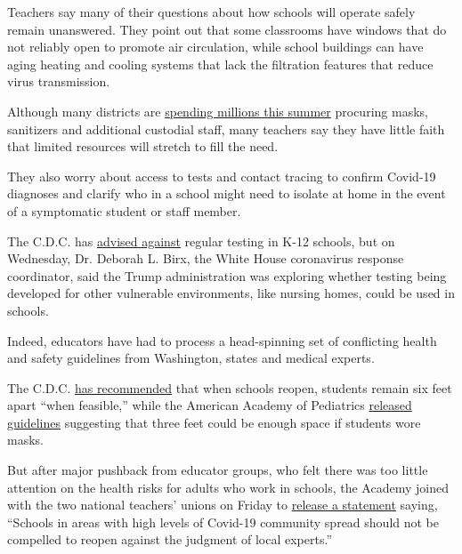 Teachers say many of their questions about how schools will operate
safely remain unanswered. They point out that some classrooms have
windows that do not reliably open to promote air circulation, while
school buildings can have aging heating and cooling systems that lack
the filtration features that reduce virus transmission.

Although many districts are
\href{https://www.nytimes.com/2020/07/09/us/schools-reopening-trump.html?smid=tw-share}{spending
millions this summer} procuring masks, sanitizers and additional
custodial staff, many teachers say they have little faith that limited
resources will stretch to fill the need.

They also worry about access to tests and contact tracing to confirm
Covid-19 diagnoses and clarify who in a school might need to isolate at
home in the event of a symptomatic student or staff member.

The C.D.C. has
\href{https://www.cdc.gov/coronavirus/2019-ncov/community/schools-childcare/k-12-testing.html}{advised
against} regular testing in K-12 schools, but on Wednesday, Dr. Deborah
L. Birx, the White House coronavirus response coordinator, said the
Trump administration was exploring whether testing being developed for
other vulnerable environments, like nursing homes, could be used in
schools.

Indeed, educators have had to process a head-spinning set of conflicting
health and safety guidelines from Washington, states and medical
experts.

The C.D.C.
\href{https://www.cdc.gov/coronavirus/2019-ncov/community/schools-childcare/schools.html}{has
recommended} that when schools reopen, students remain six feet apart
``when feasible,'' while the American Academy of Pediatrics
\href{https://www.nytimes.com/2020/06/30/us/coronavirus-schools-reopening-guidelines-aap.html}{released
guidelines} suggesting that three feet could be enough space if students
wore masks.

But after major pushback from educator groups, who felt there was too
little attention on the health risks for adults who work in schools, the
Academy joined with the two national teachers' unions on Friday to
\href{https://services.aap.org/en/news-room/news-releases/aap/2020/pediatricians-educators-and-superintendents-urge-a-safe-return-to-school-this-fall/}{release
a statement} saying, ``Schools in areas with high levels of Covid-19
community spread should not be compelled to reopen against the judgment
of local experts.''

